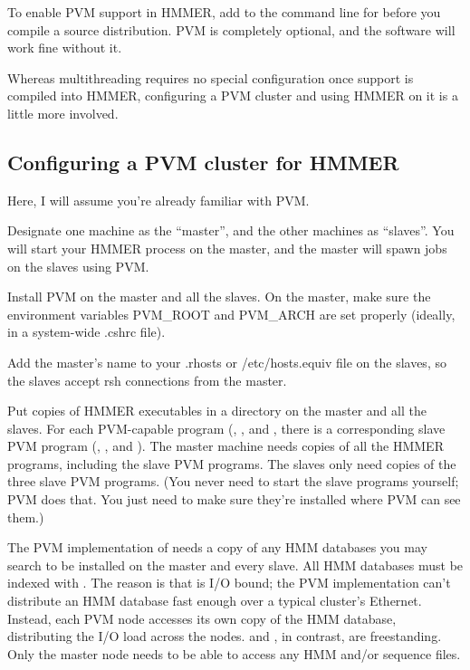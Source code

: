 To enable PVM support in HMMER, add  to the command line
for  before you compile a source distribution.  PVM is
completely optional, and the software will work fine without it.

Whereas multithreading requires no special configuration once support
is compiled into HMMER, configuring a PVM cluster and using HMMER on
it is a little more involved. 

\subsection{Configuring a PVM cluster for HMMER}

Here, I will assume you're already familiar with PVM.

Designate one machine as the ``master'', and the other machines as
``slaves''. You will start your HMMER process on the master, and the
master will spawn jobs on the slaves using PVM.

Install PVM on the master and all the slaves. On the master, make sure
the environment variables PVM\_ROOT and PVM\_ARCH are set properly
(ideally, in a system-wide .cshrc file).

Add the master's name to your .rhosts or /etc/hosts.equiv file on the
slaves, so the slaves accept rsh connections from the master.

Put copies of HMMER executables in a directory on the master and all
the slaves. For each PVM-capable program (,
, and , there is a corresponding slave
PVM program (, , and
). The master machine needs copies of all the HMMER
programs, including the slave PVM programs.  The slaves only need
copies of the three slave PVM programs. (You never need to start the
slave programs yourself; PVM does that. You just need to make sure
they're installed where PVM can see them.)

The PVM implementation of  needs a copy of any HMM
databases you may search to be installed on the master and every
slave. All HMM databases must be indexed with . The
reason is that  is I/O bound; the PVM implementation
can't distribute an HMM database fast enough over a typical cluster's
Ethernet. Instead, each PVM node accesses its own copy of the HMM
database, distributing the I/O load across the nodes.
 and , in contrast, are
freestanding. Only the master node needs to be able to access any HMM
and/or sequence files.


